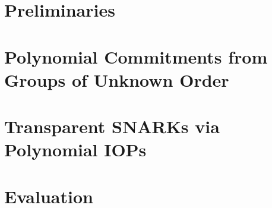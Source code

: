 \documentclass{llncs}
\begin{document}
\section{Preliminaries}


\section{Polynomial Commitments from Groups of Unknown Order}
\label{sec:protocol}


\section{Transparent SNARKs via Polynomial IOPs}\label{sec:polyiop}


\section{Evaluation}

\end{document}
